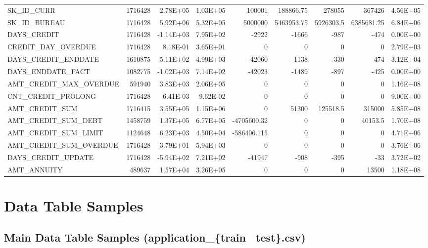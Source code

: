 \documentclass[12pt, letterpaper]{article}
\begin{document}
\begin{appendices}
{\begin{longtable}[c]{| l || r | r | r | r | r | r | r | r |}
 \hline
 \endfoot

 \hline
 \endlastfoot

 SK_ID_CURR	&	1716428	&	2.78E+05	&	1.03E+05	&	100001	&	188866.75	&	278055	&	367426	&	4.56E+05	\\
SK_ID_BUREAU	&	1716428	&	5.92E+06	&	5.32E+05	&	5000000	&	5463953.75	&	5926303.5	&	6385681.25	&	6.84E+06	\\
DAYS_CREDIT	&	1716428	&	-1.14E+03	&	7.95E+02	&	-2922	&	-1666	&	-987	&	-474	&	0.00E+00	\\
CREDIT_DAY_OVERDUE	&	1716428	&	8.18E-01	&	3.65E+01	&	0	&	0	&	0	&	0	&	2.79E+03	\\
DAYS_CREDIT_ENDDATE	&	1610875	&	5.11E+02	&	4.99E+03	&	-42060	&	-1138	&	-330	&	474	&	3.12E+04	\\
DAYS_ENDDATE_FACT	&	1082775	&	-1.02E+03	&	7.14E+02	&	-42023	&	-1489	&	-897	&	-425	&	0.00E+00	\\
AMT_CREDIT_MAX_OVERDUE	&	591940	&	3.83E+03	&	2.06E+05	&	0	&	0	&	0	&	0	&	1.16E+08	\\
CNT_CREDIT_PROLONG	&	1716428	&	6.41E-03	&	9.62E-02	&	0	&	0	&	0	&	0	&	9.00E+00	\\
AMT_CREDIT_SUM	&	1716415	&	3.55E+05	&	1.15E+06	&	0	&	51300	&	125518.5	&	315000	&	5.85E+08	\\
AMT_CREDIT_SUM_DEBT	&	1458759	&	1.37E+05	&	6.77E+05	&	-4705600.32	&	0	&	0	&	40153.5	&	1.70E+08	\\
AMT_CREDIT_SUM_LIMIT	&	1124648	&	6.23E+03	&	4.50E+04	&	-586406.115	&	0	&	0	&	0	&	4.71E+06	\\
AMT_CREDIT_SUM_OVERDUE	&	1716428	&	3.79E+01	&	5.94E+03	&	0	&	0	&	0	&	0	&	3.76E+06	\\
DAYS_CREDIT_UPDATE	&	1716428	&	-5.94E+02	&	7.21E+02	&	-41947	&	-908	&	-395	&	-33	&	3.72E+02	\\
AMT_ANNUITY	&	489637	&	1.57E+04	&	3.26E+05	&	0	&	0	&	0	&	13500	&	1.18E+08	\\
\end{longtable}
}
\normalsize

\section{Data Table Samples}
\label{appendix:datatablesamples}
\subsection{Main Data Table Samples (application_\{train \textbar~test\}.csv)}
\label{appendix:maindatatablesamples}


\end{appendices}
\end{document}
